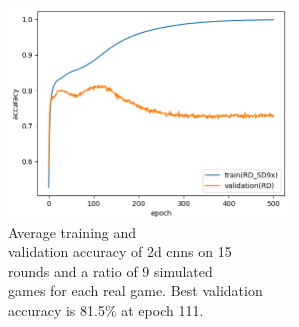 \begin{minipage}{0.5\textwidth}
	\begin{figure}[H]
		\centering
		\includegraphics[width=7.5cm]{images/bestHistories/2d_30s_sd9x_acc.png}
		\caption[Bild kurz]{Average training and \\\hspace{0\textwidth}validation accuracy of 2d cnns on 15\\\hspace{0\textwidth} rounds and a ratio of 9 simulated  \\\hspace{0\textwidth}games for each real game. Best validation \\\hspace{0\textwidth}accuracy is 81.5\% at epoch 111.}
		\label{fig:2d30}
	\end{figure}
\end{minipage}
